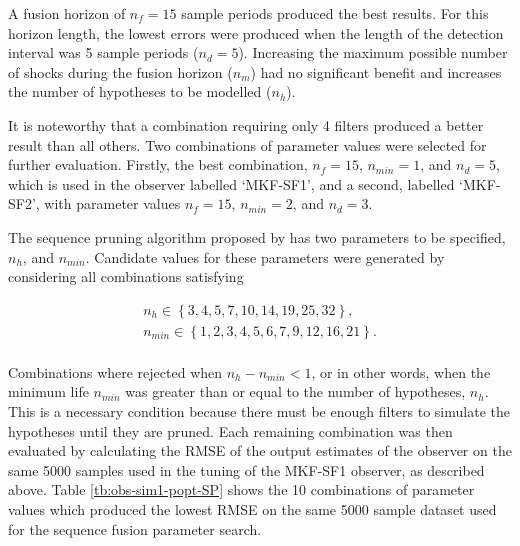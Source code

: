 A fusion horizon of $n_f=15$ sample periods produced the best results. For this horizon length, the lowest errors were produced when the length of the detection interval was 5 sample periods ($n_d=5$). Increasing the maximum possible number of shocks during the fusion horizon ($n_m$) had no significant benefit and increases the number of hypotheses to be modelled ($n_h$).

It is noteworthy that a combination requiring only 4 filters produced a better result than all others. Two combinations of parameter values were selected for further evaluation. Firstly, the best combination, $n_f=15$, $n_{min}=1$, and $n_d=5$, which is used in the observer labelled `MKF-SF1', and a second, labelled `MKF-SF2', with parameter values $n_f=15$, $n_{min}=2$, and $n_d=3$.

The sequence pruning algorithm proposed by \cite{eriksson_classification_1996} has two parameters to be specified, $n_h$, and $n_{min}$. Candidate values for these parameters were generated by considering all combinations satisfying

\begin{equation} \label{eq:sim-sys-siso-MKF-SP-param-values}
	\begin{aligned}
		n_h \in \left\{3, 4, 5, 7, 10, 14, 19, 25, 32\right\},  \\
			n_{min} \in \left\{1, 2, 3, 4, 5, 6, 7, 9, 12, 16, 21\right\}.  \\
		\end{aligned}
	\end{equation}

Combinations where rejected when $n_h - n_{min} < 1$, or in other words, when the minimum life $n_{min}$ was greater than or equal to the number of hypotheses, $n_h$. This is a necessary condition because there must be enough filters to simulate the hypotheses until they are pruned. Each remaining combination was then evaluated by calculating the RMSE of the output estimates of the observer on the same 5000 samples used in the tuning of the MKF-SF1 observer, as described above. Table \ref{tb:obs-sim1-popt-SP} shows the 10 combinations of parameter values which produced the lowest RMSE on the same 5000 sample dataset used for the sequence fusion parameter search.

